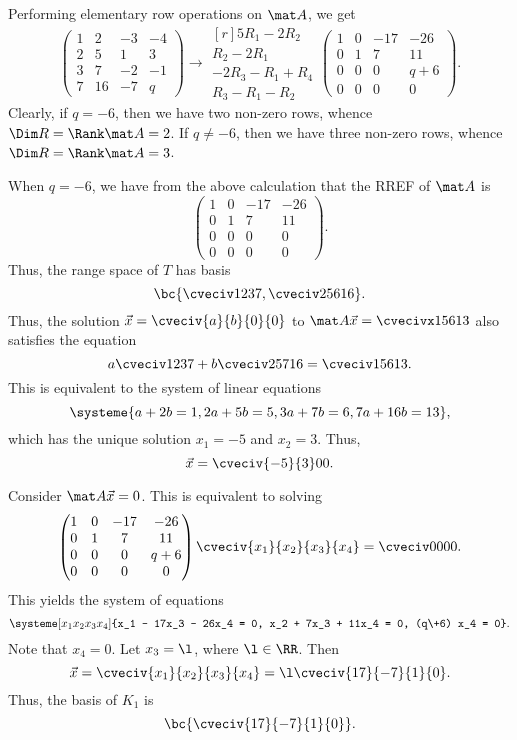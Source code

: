 \begin{solution}
    \begin{ppart}
        Performing elementary row operations on $\mat A$, we get \[\begin{pmatrix}1 & 2 & -3 & -4 \\ 2 & 5 & 1 & 3 \\ 3 & 7 & -2 & -1 \\ 7 & 16 & -7 & q\end{pmatrix} \rightarrow \begin{matrix}[r] \scriptstyle 5R_1 - 2R_2 \\ \scriptstyle R_2 - 2R_1 \\ \scriptstyle -2R_3 - R_1 + R_4 \\ \scriptstyle R_3 - R_1 - R_2\end{matrix} \begin{pmatrix}1 & 0 & -17 & -26 \\ 0 & 1 & 7 & 11 \\ 0 & 0 & 0 & q+6 \\ 0 & 0 & 0 & 0\end{pmatrix}.\] Clearly, if $q = -6$, then we have two non-zero rows, whence $\Dim R = \Rank \mat A = 2$. If $q \neq -6$, then we have three non-zero rows, whence $\Dim R = \Rank \mat A = 3$.
    \end{ppart}
    \begin{ppart}
        When $q = -6$, we have from the above calculation that the RREF of $\mat A$ is \[\begin{pmatrix}1 & 0 & -17 & -26 \\ 0 & 1 & 7 & 11 \\ 0 & 0 & 0 & 0 \\ 0 & 0 & 0 & 0\end{pmatrix}.\] Thus, the range space of $T$ has basis \[\bc{\cveciv1237, \cveciv256{16}}.\] Thus, the solution $\vec x = \cveciv{a}{b}{0}{0}$ to $\mat A \vec x = \cvecivx156{13}$ also satisfies the equation \[a \cveciv1237 + b \cveciv257{16} = \cveciv156{13}.\] This is equivalent to the system of linear equations \[\systeme{a + 2b = 1, 2a + 5b = 5, 3a + 7b = 6, 7a + 16b = 13},\] which has the unique solution $x_1 = -5$ and $x_2 = 3$. Thus, \[\vec x = \cveciv{-5}{3}00.\]
    \end{ppart}
    \begin{ppart}
        Consider $\mat A \vec x = 0$. This is equivalent to solving \[\begin{pmatrix}1 & 0 & -17 & -26 \\ 0 & 1 & 7 & 11 \\ 0 & 0 & 0 & q+6 \\ 0 & 0 & 0 & 0\end{pmatrix} \cveciv{x_1}{x_2}{x_3}{x_4} = \cveciv0000.\] This yields the system of equations \[\systeme[x_1x_2x_3x_4]{x_1 - 17x_3 - 26x_4 = 0, x_2 + 7x_3 + 11x_4 = 0, (q\+6) x_4 = 0}.\] Note that $x_4 = 0$. Let $x_3 = \l$, where $\l \in \RR$. Then \[\vec x = \cveciv{x_1}{x_2}{x_3}{x_4} = \l\cveciv{17}{-7}{1}{0}.\] Thus, the basis of $K_1$ is \[\bc{\cveciv{17}{-7}{1}{0}}.\]

\end{ppart}
\end{solution}
